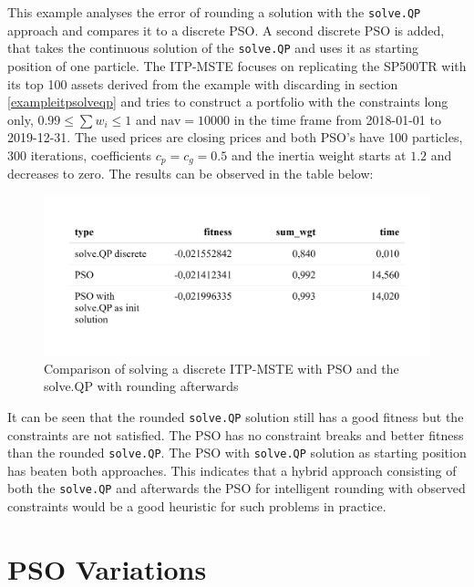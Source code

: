 \documentclass[
  oneside, a4paper, 12pt, openany]{book}
\theoremstyle{definition}
\theoremstyle{definition}
\theoremstyle{definition}
\theoremstyle{definition}
\theoremstyle{remark}
\begin{document}
This example analyses the error of rounding a solution with the \texttt{solve.QP} approach and compares it to a discrete PSO. A second discrete PSO is added, that takes the continuous solution of the \texttt{solve.QP} and uses it as starting position of one particle. The ITP-MSTE focuses on replicating the SP500TR with its top 100 assets derived from the example with discarding in section \ref{exampleitpsolveqp} and tries to construct a portfolio with the constraints long only, \(0.99 \leq \textstyle\sum w_i \leq 1\) and \(\text{nav} = 10000\) in the time frame from 2018-01-01 to 2019-12-31. The used prices are closing prices and both PSO's have 100 particles, 300 iterations, coefficients \(c_p=c_g=0.5\) and the inertia weight starts at \(1.2\) and decreases to zero. The results can be observed in the table below:

\begin{figure}[H]
\includegraphics{Master_Thesis_files/figure-latex/pso9-1} \caption{Comparison of solving a discrete ITP-MSTE with PSO and the solve.QP with rounding afterwards}\label{fig:pso9}
\end{figure}

It can be seen that the rounded \texttt{solve.QP} solution still has a good fitness but the constraints are not satisfied. The PSO has no constraint breaks and better fitness than the rounded \texttt{solve.QP}. The PSO with \texttt{solve.QP} solution as starting position has beaten both approaches. This indicates that a hybrid approach consisting of both the \texttt{solve.QP} and afterwards the PSO for intelligent rounding with observed constraints would be a good heuristic for such problems in practice.

\hypertarget{psovariants}{%
\chapter{PSO Variations}\label{psovariants}}
\end{document}
